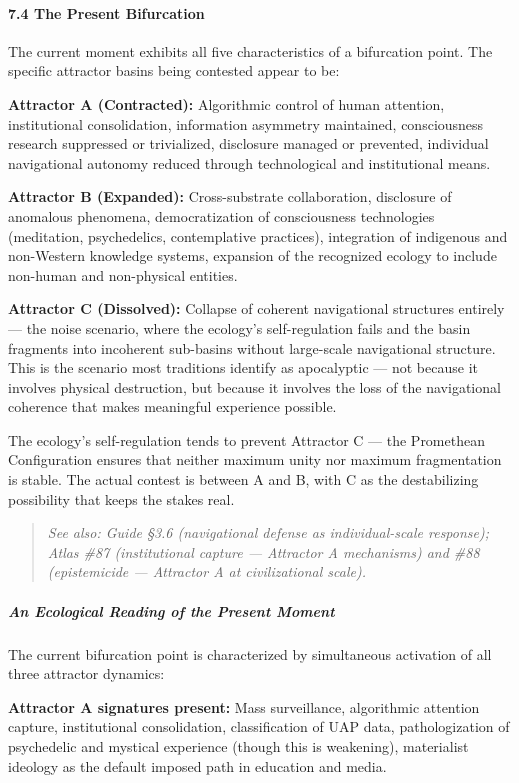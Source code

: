 \paragraph*{7.4 The Present Bifurcation}


The current moment exhibits all five characteristics of a bifurcation point. The specific attractor basins being contested appear to be:


\textbf{Attractor A (Contracted):} Algorithmic control of human attention, institutional consolidation, information asymmetry maintained, consciousness research suppressed or trivialized, disclosure managed or prevented, individual navigational autonomy reduced through technological and institutional means.


\textbf{Attractor B (Expanded):} Cross-substrate collaboration, disclosure of anomalous phenomena, democratization of consciousness technologies (meditation, psychedelics, contemplative practices), integration of indigenous and non-Western knowledge systems, expansion of the recognized ecology to include non-human and non-physical entities.


\textbf{Attractor C (Dissolved):} Collapse of coherent navigational structures entirely — the noise scenario, where the ecology's self-regulation fails and the basin fragments into incoherent sub-basins without large-scale navigational structure. This is the scenario most traditions identify as apocalyptic — not because it involves physical destruction, but because it involves the loss of the navigational coherence that makes meaningful experience possible.


The ecology's self-regulation tends to prevent Attractor C — the Promethean Configuration ensures that neither maximum unity nor maximum fragmentation is stable. The actual contest is between A and B, with C as the destabilizing possibility that keeps the stakes real.


\begin{quote}
\itshape
\textit{See also: Guide §3.6 (navigational defense as individual-scale response); Atlas \#87 (institutional capture — Attractor A mechanisms) and \#88 (epistemicide — Attractor A at civilizational scale).}
\end{quote}


\subparagraph*{An Ecological Reading of the Present Moment}


The current bifurcation point is characterized by simultaneous activation of all three attractor dynamics:


\textbf{Attractor A signatures present:} Mass surveillance, algorithmic attention capture, institutional consolidation, classification of UAP data, pathologization of psychedelic and mystical experience (though this is weakening), materialist ideology as the default imposed path in education and media.


